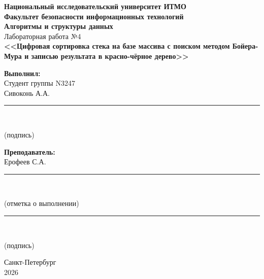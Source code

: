 \documentclass[a4paper,14pt]{extarticle}
\begin{document}
\begin{titlepage}
\begin{center}

\textbf{Национальный исследовательский университет ИТМО}\\[0.5cm]
\textbf{Факультет безопасности информационных технологий}\\[1cm]

{\Large\textbf{Алгоритмы и структуры данных}}\\[1cm]
{\large Лабораторная работа №4}\\[0.5cm]
{\large\textbf{<<Цифровая сортировка стека на базе массива с поиском методом Бойера-Мура и записью результата в красно-чёрное дерево>>}}\\[3cm]

\begin{flushright}
\begin{minipage}{0.35\textwidth}
\textbf{Выполнил:}\\
Студент группы N3247\\
Сивоконь А.А.\\[1cm]

\noindent\rule{5cm}{0.4pt}\\
\centerline{(подпись)}

\vspace{0.5cm}

\textbf{Преподаватель:}\\
Ерофеев С.А.\\[1cm]
\noindent\rule{5cm}{0.4pt}\\
\centerline{(отметка о выполнении)}

\vspace{1.5cm}

\noindent\rule{5cm}{0.4pt}\\
\centerline{(подпись)}
\end{minipage}
\end{flushright}

\vfill

Санкт-Петербург\\
2026

\end{center}
\end{titlepage}

\newpage
\renewcommand{\contentsname}{Содержание}
\tableofcontents

\newpage
\end{document}
